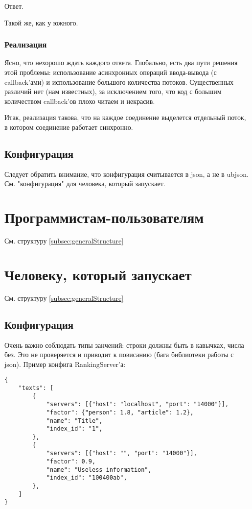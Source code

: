 \documentclass[12pt,a4paper]{article}
\begin{document}
Ответ.

Такой же, как у южного. 

\subsubsection{Реализация}
Ясно, что нехорошо ждать каждого ответа. 
Глобально, есть два пути решения этой проблемы: использование асинхронных операций ввода-вывода (с callback'ами) и использование большого количества потоков. Существенных различий нет (нам известных), за исключением того, что код с большим количеством callback'ов плохо читаем и некрасив.

Итак, реализация такова, что на каждое соединение выделется отдельный поток, в котором соединение работает синхронно.

\subsection{Конфигурация}
Следует обратить внимание, что конфигурация считывается в json, а не в ubjson.
См. "конфигурация" для человека, который запускает.

\section{Программистам-пользователям}
См. структуру \ref{subsec:generalStructure}

\section{Человеку, который запускает}
См. структуру \ref{subsec:generalStructure}
\subsection{Конфигурация}
Очень важно соблюдать типы занчений: строки должны быть в кавычках, числа без. Это не проверяется и приводит к повисанию (бага библиотеки работы с json).
Пример конфига RankingServer'а:
\begin{verbatim}
{
	"texts": [
		{
			"servers": [{"host": "localhost", "port": "14000"}],
			"factor": {"person": 1.8, "article": 1.2},
			"name": "Title",
			"index_id": "1",
		},
		{
			"servers": [{"host": "", "port": "14000"}],
			"factor": 0.9,
			"name": "Useless information",
			"index_id": "100400ab",
		},
	]
}
\end{verbatim}
\end{document}
